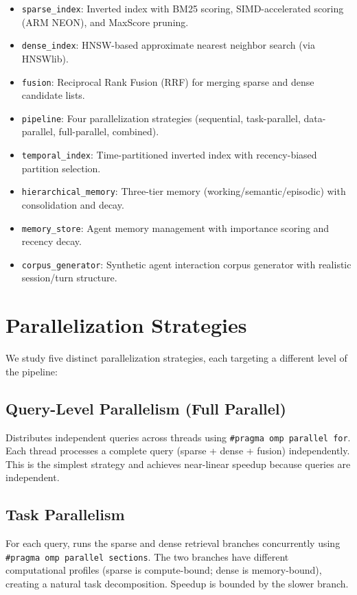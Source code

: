 \documentclass[11pt]{article}
\begin{document}
\begin{itemize}[nosep]
    \item \texttt{sparse\_index}: Inverted index with BM25 scoring, SIMD-accelerated scoring (ARM NEON), and MaxScore pruning.
    \item \texttt{dense\_index}: HNSW-based approximate nearest neighbor search (via HNSWlib).
    \item \texttt{fusion}: Reciprocal Rank Fusion (RRF) for merging sparse and dense candidate lists.
    \item \texttt{pipeline}: Four parallelization strategies (sequential, task-parallel, data-parallel, full-parallel, combined).
    \item \texttt{temporal\_index}: Time-partitioned inverted index with recency-biased partition selection.
    \item \texttt{hierarchical\_memory}: Three-tier memory (working/semantic/episodic) with consolidation and decay.
    \item \texttt{memory\_store}: Agent memory management with importance scoring and recency decay.
    \item \texttt{corpus\_generator}: Synthetic agent interaction corpus generator with realistic session/turn structure.
\end{itemize}

\section{Parallelization Strategies}

We study five distinct parallelization strategies, each targeting a different level of the pipeline:

\subsection{Query-Level Parallelism (Full Parallel)}
Distributes independent queries across threads using \texttt{\#pragma omp parallel for}. Each thread processes a complete query (sparse + dense + fusion) independently. This is the simplest strategy and achieves near-linear speedup because queries are independent.

\subsection{Task Parallelism}
For each query, runs the sparse and dense retrieval branches concurrently using \texttt{\#pragma omp parallel sections}. The two branches have different computational profiles (sparse is compute-bound; dense is memory-bound), creating a natural task decomposition. Speedup is bounded by the slower branch.
\end{document}

